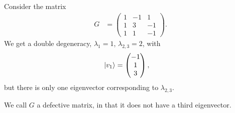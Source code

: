 \documentclass[10pt]{mypackage}
\begin{document}
\begin{example}
  Consider the matrix
  \begin{align*}
    G &= \begin{pmatrix}1 & -1 & 1 \\ 1 & 3 & -1 \\ 1 & 1 & -1\end{pmatrix}.
  \end{align*}
  We get a double degeneracy, $\lambda_1 = 1$, $\lambda_{2,3} = 2$, with
  \begin{align*}
    \ket{v_1} &= \begin{pmatrix}-1\\1\\3\end{pmatrix},
  \end{align*}
  but there is only one eigenvector corresponding to $\lambda_{2,3}$.\newline

  We call $G$ a defective matrix, in that it does not have a third eigenvector.
\end{example}
\end{document}

